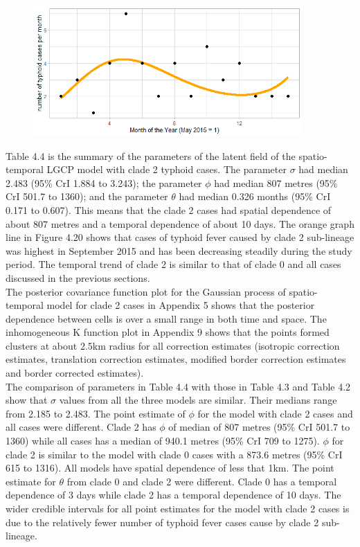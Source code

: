 \documentclass[12pt,a4paper]{report}
\begin{document}
\begin{figure}[H]
\begin{center}
\includegraphics[width = \linewidth, height = 50mm]{Long term trend of temporal model - Major 2.png}
\end{center}
\end{figure}

Table 4.4 is the summary of the parameters of the latent field of the spatio-temporal LGCP model with clade 2 typhoid cases. The parameter $\sigma$ had median 2.483 (95\% CrI 1.884 to 3.243); the parameter $\phi$ had median 807 metres (95\% CrI 501.7 to 1360); and the parameter $\theta$ had median 0.326 months (95\% CrI 0.171 to 0.607). This means that the clade 2 cases had spatial dependence of about 807 metres and a temporal dependence of about 10 days. The orange graph line in Figure 4.20 shows that cases of typhoid fever caused by clade 2 sub-lineage was highest in September 2015 and has been decreasing steadily during the study period. The temporal trend of clade 2 is similar to that of clade 0 and all cases discussed in the previous sections.\\

The posterior covariance function plot for the Gaussian process of spatio-temporal model for clade 2 cases in Appendix 5 shows that the posterior dependence between cells is over a small range in both time and space. The inhomogeneous K function plot in Appendix 9 shows that the points formed clusters at about 2.5km radius for all correction estimates (isotropic correction estimates, translation correction estimates, modified border correction estimates and border corrected estimates).\\

The comparison of parameters in Table 4.4 with those in Table 4.3 and Table 4.2 show that $\sigma$ values from all the three models are similar. Their medians range from 2.185 to 2.483. The point estimate of $\phi$ for the model with clade 2 cases and all cases were different. Clade 2 has $\phi$ of median of 807 metres (95\% CrI 501.7 to 1360) while all cases has a median of 940.1 metres (95\% CrI 709 to 1275). $\phi$ for clade 2 is similar to the model with clade 0 cases with a 873.6 metres (95\% CrI 615 to 1316). All models have spatial dependence of less that 1km. The point estimate for $\theta$ from clade 0 and clade 2 were different. Clade 0 has a temporal dependence of 3 days while clade 2 has a temporal dependence of 10 days. The wider credible intervals for all point estimates for the model with clade 2 cases is due to the relatively fewer number of typhoid fever cases cause by clade 2 sub-lineage.
\end{document}

